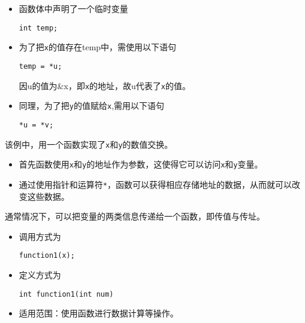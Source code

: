 \begin{frame}[fragile]
\begin{itemize}
\item
函数体中声明了一个临时变量
\begin{lstlisting}[backgroundcolor=\color{blue!10}]
int temp;
\end{lstlisting}
\item
为了把\lstinline|x|的值存在{\tf temp}中，需使用以下语句
\begin{lstlisting}[backgroundcolor=\color{blue!10}]
temp = *u; 
\end{lstlisting}
因{\tf u}的值为{\tf \&x}，即\lstinline|x|的地址，故{\tf *u}代表了\lstinline|x|的值。\\[0.1in]
\item 
同理，为了把\lstinline|y|的值赋给\lstinline|x|,需用以下语句
\begin{lstlisting}[backgroundcolor=\color{blue!10}]
*u = *v;
\end{lstlisting}
\end{itemize}
\end{frame}

\begin{frame}[fragile]
该例中，用一个函数实现了\lstinline|x|和\lstinline|y|的数值交换。\vspace{0.1in}

\begin{itemize}
\item
首先函数使用\lstinline|x|和\lstinline|y|的地址作为参数，这使得它可以访问\lstinline|x|和\lstinline|y|变量。\\[0.1in]
\item 
通过使用指针和运算符\lstinline|*|，函数可以获得相应存储地址的数据，从而就可以改变这些数据。
\end{itemize}
\end{frame}

\begin{frame}[fragile]
通常情况下，可以把变量的两类信息传递给一个函数，即传值与传址。
\end{frame}

\begin{frame}[fragile]
\begin{itemize}
\item 调用方式为
\begin{lstlisting}[backgroundcolor=\color{blue!10}]
function1(x);
\end{lstlisting}
\item 定义方式为
\begin{lstlisting}[backgroundcolor=\color{blue!10}]
int function1(int num)
\end{lstlisting}
\item 适用范围：使用函数进行数据计算等操作。
\end{itemize}

\end{frame}


